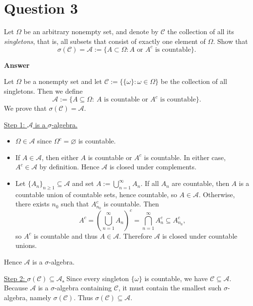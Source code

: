 \documentclass[letterpaper]{article}
\begin{document}
		
		\clearpage
		
		\section{Question 3}
		
		Let $\Omega$ be an arbitrary nonempty set, and denote by $\mathcal{C}$ the
		collection of all its \emph{singletons}, that is, all subsets that consist of
		exactly one element of $\Omega$. Show that
		\[
		\sigma(\mathcal{C}) = \mathcal{A}
		:= \bigl\{ A \subset \Omega : A \text{ or } A^c \text{ is countable} \bigr\}.
		\]
		
		
		\textbf{Answer}
		
			Let $\Omega$ be a nonempty set and let
			$\mathcal{C}:=\bigl\{\{\omega\}:\omega\in\Omega\bigr\}$ be the collection of all singletons.
			Then we define
			\[
			\mathcal{A}:=\{A\subseteq\Omega:\ A \text{ is countable or } A^c \text{ is countable}\}.
			\]
			We prove that $\sigma(\mathcal{C})=\mathcal{A}$.
			
			\medskip
			\noindent\underline{Step 1: $\mathcal{A}$ is a $\sigma$-algebra.}
			\begin{itemize}
				\item $\Omega\in\mathcal{A}$ since $\Omega^c=\varnothing$ is countable.
				\item If $A\in\mathcal{A}$, then either $A$ is countable or $A^c$ is countable.
				In either case, $A^c\in\mathcal{A}$ by definition. Hence $\mathcal{A}$ is closed under complements.
				\item Let $\{A_n\}_{n\ge 1}\subseteq\mathcal{A}$ and set $A:=\bigcup_{n=1}^\infty A_n$.
				If all $A_n$ are countable, then $A$ is a countable union of countable sets, hence countable,
				so $A\in\mathcal{A}$.
				Otherwise, there exists $n_0$ such that $A_{n_0}^c$ is countable. Then
				\[
				A^c=\left(\bigcup_{n=1}^\infty A_n\right)^c=\bigcap_{n=1}^\infty A_n^c \subseteq A_{n_0}^c,
				\]
				so $A^c$ is countable and thus $A\in\mathcal{A}$.
				Therefore $\mathcal{A}$ is closed under countable unions.
			\end{itemize}
			Hence $\mathcal{A}$ is a $\sigma$-algebra.
			
			\medskip
			\noindent\underline{Step 2: $\sigma(\mathcal{C})\subseteq\mathcal{A}$.}
			Since every singleton $\{\omega\}$ is countable, we have $\mathcal{C}\subseteq\mathcal{A}$.
			Because $\mathcal{A}$ is a $\sigma$-algebra containing $\mathcal{C}$, it must contain
			the smallest such $\sigma$-algebra, namely $\sigma(\mathcal{C})$. Thus
			$\sigma(\mathcal{C})\subseteq\mathcal{A}$.
			
\end{document}
